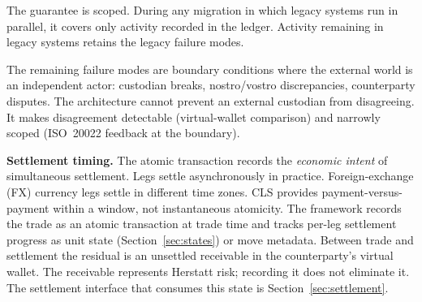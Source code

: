 The guarantee is scoped. During any migration in which legacy systems run in parallel, it covers only activity recorded in the ledger. Activity remaining in legacy systems retains the legacy failure modes.

The remaining failure modes are boundary conditions where the external world is an independent actor: custodian breaks, nostro/vostro discrepancies, counterparty disputes. The architecture cannot prevent an external custodian from disagreeing. It makes disagreement detectable (virtual-wallet comparison) and narrowly scoped (ISO~20022 feedback at the boundary).

\noindent\textbf{Settlement timing.} The atomic transaction records the \emph{economic intent} of simultaneous settlement. Legs settle asynchronously in practice. Foreign-exchange (FX) currency legs settle in different time zones. CLS provides payment-versus-payment within a window, not instantaneous atomicity. The framework records the trade as an atomic transaction at trade time and tracks per-leg settlement progress as unit state (Section~\ref{sec:states}) or move metadata. Between trade and settlement the residual is an unsettled receivable in the counterparty's virtual wallet. The receivable represents Herstatt risk; recording it does not eliminate it. The settlement interface that consumes this state is Section~\ref{sec:settlement}.

\clearpage

